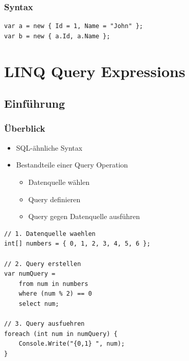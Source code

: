 \subsubsection{Syntax}
\begin{lstlisting}
var a = new { Id = 1, Name = "John" };
var b = new { a.Id, a.Name };
\end{lstlisting}




\section{LINQ Query Expressions}

\subsection{Einführung}
\subsubsection{Überblick}
\begin{itemize}
    \item SQL-ähnliche Syntax
    \item Bestandteile einer Query Operation
    \begin{itemize}
        \item Datenquelle wählen 
        \item Query definieren 
        \item Query gegen Datenquelle ausführen
    \end{itemize}
\end{itemize}
\begin{lstlisting}
// 1. Datenquelle waehlen
int[] numbers = { 0, 1, 2, 3, 4, 5, 6 };

// 2. Query erstellen
var numQuery =
    from num in numbers
    where (num % 2) == 0
    select num;

// 3. Query ausfuehren
foreach (int num in numQuery) {
    Console.Write("{0,1} ", num);
}
\end{lstlisting}

